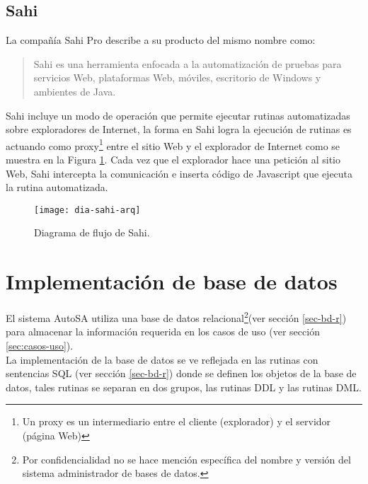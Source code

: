 \subsection{Sahi}\label{sec-sahi}
La compañía Sahi Pro\textsuperscript{\textcopyright}\cite{SahiPro} describe a su producto del mismo nombre como:
\begin{quote}
	Sahi es una herramienta enfocada a la automatización de pruebas para servicios Web, plataformas Web, móviles, escritorio de Windows\textsuperscript{\textcopyright} y ambientes de Java.
\end{quote}

Sahi incluye un modo de operación que permite ejecutar rutinas automatizadas sobre exploradores de Internet, la forma en Sahi logra la ejecución de rutinas es actuando como proxy\footnote{Un proxy es un intermediario entre el cliente (explorador) y el servidor (página Web)\cite{BeginningUbuntuLinux}} entre el sitio Web y el explorador de Internet como se muestra en la Figura \ref{fig:dia-sahi-arq}. Cada vez que el explorador hace una petición al sitio Web, Sahi intercepta la comunicación e inserta código de Javascript que ejecuta la rutina automatizada.\cite{WebEng9IntConf, SahiPro}

\begin{figure}[h]
\centering
\texttt{[image: dia-sahi-arq]}
\caption{Diagrama de flujo de Sahi\cite{SahiPro}.}
\label{fig:dia-sahi-arq}
\end{figure}

%

\section{Implementación de base de datos}
El sistema AutoSA utiliza una base de datos relacional\footnote{Por confidencialidad no se hace mención específica del nombre y versión del sistema administrador de bases de datos.}(ver sección \ref{sec-bd-r}) para almacenar la información requerida en los casos de uso (ver sección \ref{sec:casos-uso}).\\
La implementación de la base de datos se ve reflejada en las rutinas con sentencias SQL (ver sección \ref{sec-bd-r}) donde se definen los objetos de la base de datos, tales rutinas se separan en dos grupos, las rutinas DDL y las rutinas DML.


